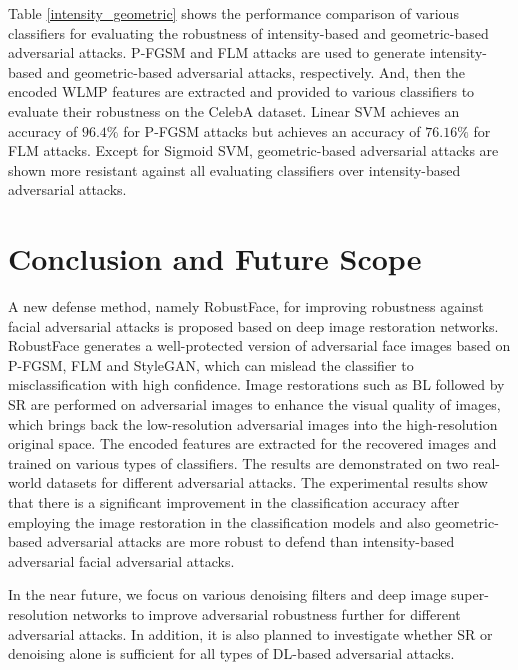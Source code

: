 \documentclass[sn-mathphys]{sn-jnl}%
\theoremstyle{thmstyleone}%
\theoremstyle{thmstyletwo}%
\theoremstyle{thmstylethree}%
\begin{document}
Table \ref{intensity_geometric} shows the performance comparison of various classifiers for evaluating the robustness of intensity-based and geometric-based adversarial attacks. P-FGSM \cite{li2019scene} and FLM \cite{dabouei2019fast} attacks are used to generate intensity-based and geometric-based adversarial attacks, respectively. And, then the encoded WLMP features are extracted and provided to various classifiers to evaluate their robustness on the CelebA dataset. Linear SVM achieves an accuracy of $96.4\%$ for P-FGSM attacks but achieves an accuracy of $76.16\%$ for FLM attacks. Except for Sigmoid SVM, geometric-based adversarial attacks are shown more resistant against all evaluating classifiers over intensity-based adversarial attacks. 

\section{Conclusion and Future Scope}
A new defense method, namely RobustFace, for improving robustness against facial adversarial attacks is proposed based on deep image restoration networks. RobustFace generates a well-protected version of adversarial face images based on P-FGSM, FLM and StyleGAN, which can mislead the classifier to misclassification with high confidence. Image restorations such as BL followed by SR are performed on adversarial images to enhance the visual quality of images, which brings back the low-resolution adversarial images into the high-resolution original space. The encoded features are extracted for the recovered images and trained on various types of classifiers. The results are demonstrated on two real-world datasets for different adversarial attacks. The experimental results show that there is a significant improvement in the classification accuracy after employing the image restoration in the classification models and also geometric-based adversarial attacks are more robust to defend than intensity-based adversarial facial adversarial attacks.    

In the near future, we focus on various denoising filters and deep image super-resolution networks to improve adversarial robustness further for different adversarial attacks. In addition, it is also planned to investigate whether SR or denoising alone is sufficient for all types of DL-based adversarial attacks.\\
\end{document}

